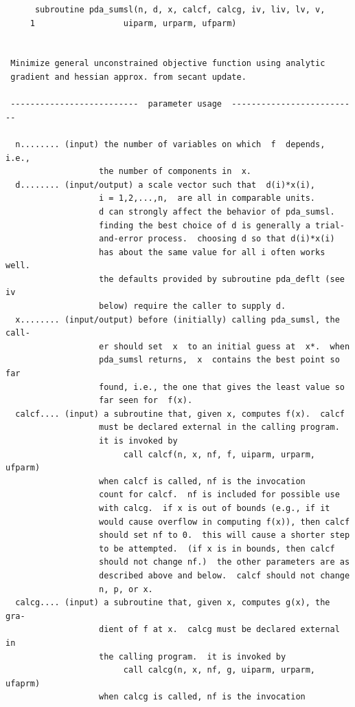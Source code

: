 \documentclass[11pt,twoside]{article}
\begin{document}
\begin{verbatim}
      subroutine pda_sumsl(n, d, x, calcf, calcg, iv, liv, lv, v,
     1                  uiparm, urparm, ufparm)


 Minimize general unconstrained objective function using analytic
 gradient and hessian approx. from secant update.

 --------------------------  parameter usage  --------------------------

  n........ (input) the number of variables on which  f  depends, i.e.,
                   the number of components in  x.
  d........ (input/output) a scale vector such that  d(i)*x(i),
                   i = 1,2,...,n,  are all in comparable units.
                   d can strongly affect the behavior of pda_sumsl.
                   finding the best choice of d is generally a trial-
                   and-error process.  choosing d so that d(i)*x(i)
                   has about the same value for all i often works well.
                   the defaults provided by subroutine pda_deflt (see iv
                   below) require the caller to supply d.
  x........ (input/output) before (initially) calling pda_sumsl, the call-
                   er should set  x  to an initial guess at  x*.  when
                   pda_sumsl returns,  x  contains the best point so far
                   found, i.e., the one that gives the least value so
                   far seen for  f(x).
  calcf.... (input) a subroutine that, given x, computes f(x).  calcf
                   must be declared external in the calling program.
                   it is invoked by
                        call calcf(n, x, nf, f, uiparm, urparm, ufparm)
                   when calcf is called, nf is the invocation
                   count for calcf.  nf is included for possible use
                   with calcg.  if x is out of bounds (e.g., if it
                   would cause overflow in computing f(x)), then calcf
                   should set nf to 0.  this will cause a shorter step
                   to be attempted.  (if x is in bounds, then calcf
                   should not change nf.)  the other parameters are as
                   described above and below.  calcf should not change
                   n, p, or x.
  calcg.... (input) a subroutine that, given x, computes g(x), the gra-
                   dient of f at x.  calcg must be declared external in
                   the calling program.  it is invoked by
                        call calcg(n, x, nf, g, uiparm, urparm, ufaprm)
                   when calcg is called, nf is the invocation

\end{verbatim}
\end{document}
